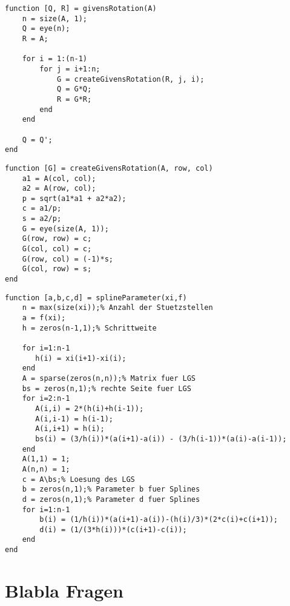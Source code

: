 \documentclass[fs, footer]{latex4ei}
\begin{document}
\begin{multicols*}{4}
\begin{lstlisting}
function [Q, R] = givensRotation(A)
    n = size(A, 1);
    Q = eye(n);
    R = A;

    for i = 1:(n-1)
        for j = i+1:n;
            G = createGivensRotation(R, j, i);
            Q = G*Q;
            R = G*R;
        end
    end

    Q = Q';
end
\end{lstlisting}

\begin{lstlisting}
function [G] = createGivensRotation(A, row, col)
    a1 = A(col, col);
    a2 = A(row, col);
    p = sqrt(a1*a1 + a2*a2);
    c = a1/p;
    s = a2/p;
    G = eye(size(A, 1));
    G(row, row) = c;
    G(col, col) = c;
    G(row, col) = (-1)*s;
    G(col, row) = s;
end
\end{lstlisting}

\begin{lstlisting}
function [a,b,c,d] = splineParameter(xi,f)
	n = max(size(xi));% Anzahl der Stuetzstellen
	a = f(xi);
    h = zeros(n-1,1);% Schrittweite

    for i=1:n-1
       h(i) = xi(i+1)-xi(i);
    end
    A = sparse(zeros(n,n));% Matrix fuer LGS
    bs = zeros(n,1);% rechte Seite fuer LGS
    for i=2:n-1
       A(i,i) = 2*(h(i)+h(i-1));
       A(i,i-1) = h(i-1);
       A(i,i+1) = h(i);
       bs(i) = (3/h(i))*(a(i+1)-a(i)) - (3/h(i-1))*(a(i)-a(i-1));
    end
    A(1,1) = 1;
    A(n,n) = 1;
    c = A\bs;% Loesung des LGS
    b = zeros(n,1);% Parameter b fuer Splines
    d = zeros(n,1);% Parameter d fuer Splines
    for i=1:n-1
        b(i) = (1/h(i))*(a(i+1)-a(i))-(h(i)/3)*(2*c(i)+c(i+1));
        d(i) = (1/(3*h(i)))*(c(i+1)-c(i));
    end
end
\end{lstlisting}

\section{Blabla Fragen}
\end{multicols*}
\end{document}
